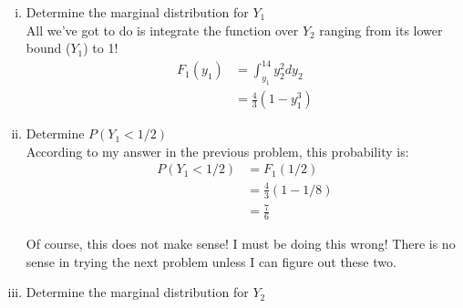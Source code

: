 \documentclass{scrartcl}
\begin{document}
\begin{enumerate}
\begin{enumerate}[i.]
        
      \item Determine the marginal distribution for $Y_1$\\
        All we've got to do is integrate the function over $Y_2$ ranging from its lower bound ($Y_1$) to 1!
        \begin{align*}
          F_1(y_1) &= \int_{y_1}^14y_2^2dy_2\\
          &= \frac{4}{3}\left(1 - y_1^3\right)
        \end{align*}
        
      \item Determine $P(Y_1<1/2)$\\
        According to my answer in the previous problem, this probability is:
        \begin{align*}
          P(Y_1<1/2) &= F_1(1/2)\\
          &= \frac{4}{3}\left(1 - 1/8\right)\\
          &= \frac{7}{6}
        \end{align*}
        
        Of course, this does not make sense! I must be doing this wrong! There is no sense in trying the next problem unless I can figure out these two.\\

      \item Determine the marginal distribution for $Y_2$
        
        
    \end{enumerate}
\end{enumerate}
\end{document}
